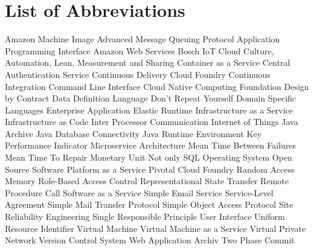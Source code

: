 
\chapter*{List of Abbreviations}

\begin{acronym}

  {Amazon Machine Image}
  {Advanced Message Queuing Protocol}
  {Application Programming Interface}
  {Amazon Web Services}
  {Bosch IoT Cloud}
  {Culture, Automation, Lean, Measurement and Sharing}
  {Container as a Service}
  {Central Authentication Service}
  {Continuous Delivery}
  {Cloud Foundry}
  {Continuous Integration}
  {Command Line Interface}
  {Cloud Native Computing Foundation}
  {Design by Contract}
  {Data Definition Language}
  {Don't Repeat Yourself}
  {Domain Specific Languages}
  {Enterprise Application}
  {Elastic Runtime}
  {Infrastructure as a Service}
  {Infrastructure as Code}
  {Inter Processor Communication}
  {Internet of Things}
  {Java Archive}
  {Java Database Connectivity}
  {Java Runtime Environment}
   {Key Performance Indicator}
  {Microservice Architecture}
  {Mean Time Between Failures}
  {Mean Time To Repair}
  {Monetary Unit}
  {Not only SQL}
  {Operating System}
  {Open Source Software}
  {Platform as a Service}
  {Pivotal Cloud Foundry}
  {Random Access Memory}
  {Role-Based Access Control}
  {Representational State Transfer}
  {Remote Procedure Call}
  {Software as a Service}
  {Simple Email Service}
  {Service-Level Agreement}
  {Simple Mail Transfer Protocol}
  {Simple Object Access Protocol}
  {Site Reliability Engineering}
  {Single Responsible Principle}
  {User Interface}%
  {Uniform Resource Identifier}%
  {Virtual Machine}%
  {Virtual Machine as a Service}
  {Virtual Private Network}%
  {Version Control System}
  {Web Application Archiv}
  {Two Phase Commit}
 
\end{acronym}